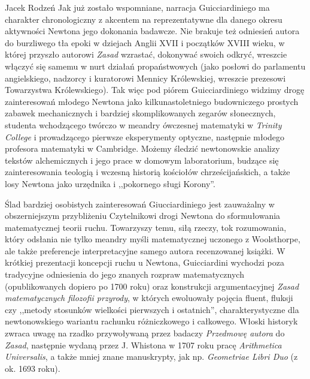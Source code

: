 \begin{recplenv}{Jacek Rodzeń}
Jak już zostało wspomniane, narracja Guicciardiniego ma charakter chronologiczny z akcentem na reprezentatywne dla
danego okresu aktywności Newtona jego dokonania badawcze. Nie brakuje też odniesień autora do burzliwego tła epoki w
dziejach Anglii XVII i początków XVIII wieku, w której przyszło autorowi \textit{Zasad} wzrastać, dokonywać swoich
odkryć, wreszcie włączyć się samemu w nurt działań propaństwowych (jako posłowi do parlamentu angielskiego, nadzorcy i
kuratorowi Mennicy Królewskiej, wreszcie prezesowi Towarzystwa Królewskiego). Tak więc pod piórem Guicciardiniego
widzimy drogę zainteresowań młodego Newtona jako kilkunastoletniego budowniczego prostych zabawek mechanicznych i
bardziej skomplikowanych zegarów słonecznych, studenta wchodzącego twórczo w meandry ówczesnej matematyki w
\textit{Trinity College} i prowadzącego pierwsze eksperymenty optyczne, następnie młodego profesora matematyki w
Cambridge. Możemy śledzić newtonowskie analizy tekstów alchemicznych i jego prace w domowym laboratorium, budzące się
zainteresowania teologią i wczesną historią kościołów chrześcijańskich, a także losy Newtona jako urzędnika i
,,pokornego sługi Korony''.

Ślad bardziej osobistych zainteresowań Giucciardiniego jest zauważalny w obszerniejszym przybliżeniu Czytelnikowi
drogi Newtona do sformułowania matematycznej teorii ruchu. Towarzyszy temu, siłą rzeczy, tok rozumowania, który
odsłania nie tylko meandry myśli matematycznej uczonego z Woolsthorpe, ale także preferencje interpretacyjne samego
autora recenzowanej książki. W krótkiej prezentacji koncepcji ruchu u Newtona, Guicciardini wychodzi poza tradycyjne
odniesienia do jego znanych rozpraw matematycznych (opublikowanych dopiero po 1700 roku) oraz konstrukcji
argumentacyjnej \textit{Zasad matematycznych filozofii przyrody}, w których ewoluowały pojęcia fluent, fluksji czy
,,metody stosunków wielkości pierwszych i ostatnich'', charakterystyczne dla newtonowskiego wariantu rachunku
różniczkowego i całkowego. Włoski historyk zwraca uwagę na rzadko przywoływaną przez badaczy \textit{Przedmowę autora}
do \textit{Zasad}, następnie wydaną przez J. Whistona w 1707 roku pracę \textit{Arithmetica Universalis}, a także mniej
znane manuskrypty, jak np. \textit{Geometriae Libri Duo }(z ok. 1693 roku). 


\end{recplenv}
